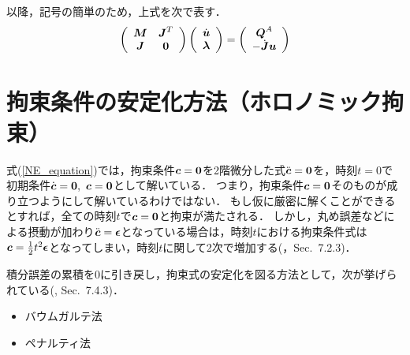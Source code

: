 \documentclass{jsarticle}
\begin{document}
以降，記号の簡単のため，上式を次で表す．
\begin{align}
   \left(
    \begin{array}{cc}
       \mbox{\boldmath $M$}   & \mbox{\boldmath $J$}^T\\
       \mbox{\boldmath $J$}   & \mbox{\bf 0}
    \end{array}
   \right)
   \left(
    \begin{array}{c}
       \dot{\mbox{\boldmath $u$}}\\
       \mbox{\boldmath $\lambda$}
    \end{array}
   \right)
=
   \left(
    \begin{array}{c}
       \mbox{\boldmath $Q$}^A\\
       -\dot{\mbox{\boldmath $J$}}\mbox{\boldmath $u$}
    \end{array}
   \right)\label{NE_equation}
\end{align}


\section{拘束条件の安定化方法（ホロノミック拘束）}
式(\ref{NE_equation})では，拘束条件$\mbox{\boldmath $c$}=\mbox{\bf 0}$を2階微分した式$\ddot{\mbox{\boldmath $c$}}=\mbox{\bf 0}$を，時刻$t=0$で初期条件$\dot{\mbox{\boldmath $c$}}=\mbox{\bf 0},~\mbox{\boldmath $c$}=\mbox{\bf 0}$として解いている．
つまり，拘束条件$\mbox{\boldmath $c$}=\mbox{\bf 0}$そのものが成り立つようにして解いているわけではない．
もし仮に厳密に解くことができるとすれば，全ての時刻$t$で$\mbox{\boldmath $c$}=\mbox{\bf 0}$と拘束が満たされる．
しかし，丸め誤差などによる摂動が加わり$\ddot{\mbox{\boldmath $c$}}=\mbox{\boldmath $\epsilon$}$となっている場合は，時刻$t$における拘束条件式は$\mbox{\boldmath $c$}=\frac{1}{2}t^2\mbox{\boldmath $\epsilon$} $となってしまい，時刻$t$に関して2次で増加する(\cite{Book2003JSME}，Sec.~7.2.3)．

積分誤差の累積を0に引き戻し，拘束式の安定化を図る方法として，次が挙げられている(\cite{Book2007JSME}, Sec.~7.4.3)．
\begin{itemize}
 \item バウムガルテ法
 \item ペナルティ法
\end{itemize}
\end{document}
